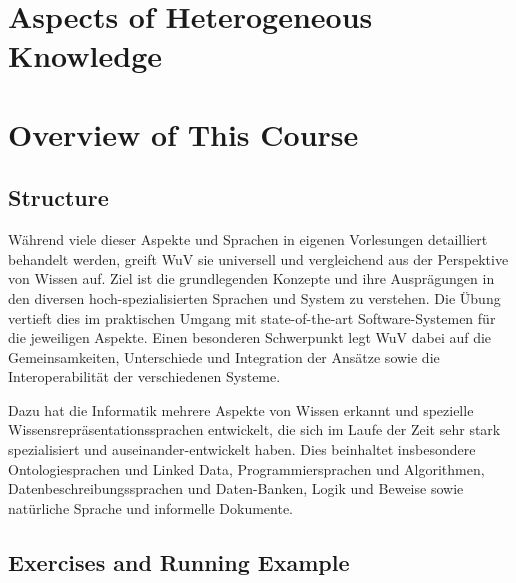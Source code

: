 \section{Aspects of Heterogeneous Knowledge}

\section{Overview of This Course}

\subsection{Structure}

Während viele dieser Aspekte und Sprachen in eigenen Vorlesungen detailliert behandelt werden, greift WuV sie universell und vergleichend aus der Perspektive von Wissen auf. Ziel ist die grundlegenden Konzepte und ihre Ausprägungen in den diversen hoch-spezialisierten Sprachen und System zu verstehen. Die Übung vertieft dies im praktischen Umgang mit state-of-the-art Software-Systemen für die jeweiligen Aspekte. Einen besonderen Schwerpunkt legt WuV dabei auf die Gemeinsamkeiten, Unterschiede und Integration der Ansätze sowie die Interoperabilität der verschiedenen Systeme.

 Dazu hat die Informatik mehrere Aspekte von Wissen erkannt und spezielle Wissensrepräsentationssprachen entwickelt, die sich im Laufe der Zeit sehr stark spezialisiert und auseinander-entwickelt haben. Dies beinhaltet insbesondere Ontologiesprachen und Linked Data, Programmiersprachen und Algorithmen, Datenbeschreibungssprachen und Daten-Banken, Logik und Beweise sowie natürliche Sprache und informelle Dokumente.


\subsection{Exercises and Running Example}
